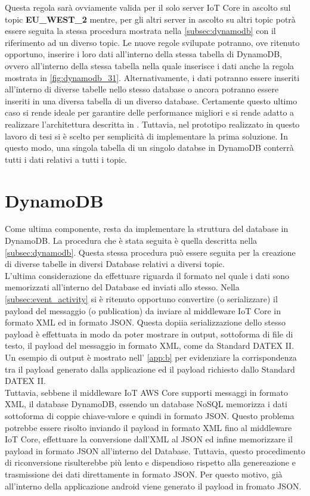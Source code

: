 Questa regola sarà ovviamente valida per il solo server IoT Core in ascolto sul topic \textbf{EU\_WEST\_2} mentre, per gli altri server in ascolto su altri topic potrà essere seguita la stessa procedura mostrata nella \autoref{subsec:dynamodb} con il riferimento ad un diverso topic.
Le nuove regole svilupate potranno, ove ritenuto opportuno, inserire i loro dati all'interno della stessa tabella di DynamoDB, ovvero all'interno della stessa tabella nella quale inserisce i dati anche la regola mostrata in \autoref{fig:dynamodb_31}. Alternativamente, i dati potranno essere inseriti all'interno di diverse tabelle nello stesso database o ancora potranno essere inseriti in una diversa tabella di un diverso database. Certamente questo ultimo caso si rende ideale per garantire delle performance migliori e si rende adatto a realizzare l'architettura descritta in \cite{famous:paper_detti_1}.
Tuttavia, nel prototipo realizzato in questo lavoro di tesi si è scelto per semplicità di implementare la prima soluzione. In questo modo, una singola tabella di un singolo databse in DynamoDB conterrà tutti i dati relativi a tutti i topic.


\section{DynamoDB}
Come ultima componente, resta da implementare la struttura del database in DynamoDB. La procedura che è stata seguita è quella descritta nella \autoref{subsec:dynamodb}. Questa stessa procedura può essere seguita per la creazione di diverse tabelle in diversi Database relativi a diversi topic. \\
L'ultima considerazione da effettuare riguarda il formato nel quale i dati sono memorizzati all'interno del Database ed inviati allo stesso.
Nella \autoref{subsec:event_activity} si è ritenuto opportuno convertire (o serializzare) il payload del messaggio (o publication) da inviare al middleware IoT Core in formato XML ed in formato JSON. Questa dopiia serializzazione dello stesso payload è effettuata in modo da poter mostrare in output, sottoforma di file di testo, il payload del messaggio in formato XML, come da Standard DATEX II. Un esempio di output è mostrato nell' \autoref{app:b} per evidenziare la corrispondenza tra il payload generato dalla applicazione ed il payload richiesto dallo Standard DATEX II.\\
Tuttavia, sebbene il middleware IoT AWS Core supporti messaggi in formato XML, il database DynamoDB, essendo un database NoSQL memorizza i dati sottoforma di coppie chiave-valore e quindi in formato JSON. 
Questo problema potrebbe essere risolto inviando il payload in formato XML fino al middleware IoT Core, effettuare la conversione dall'XML al JSON ed infine memorizzare il payload in formato JSON all'interno del Database. Tuttavia, questo procedimento di riconversione risulterebbe più lento e dispendioso rispetto alla genereazione e trasmissione dei dati direttamente in formato JSON. Per questo motivo, già all'interno della applicazione android viene generato il payload in fromato JSON.

